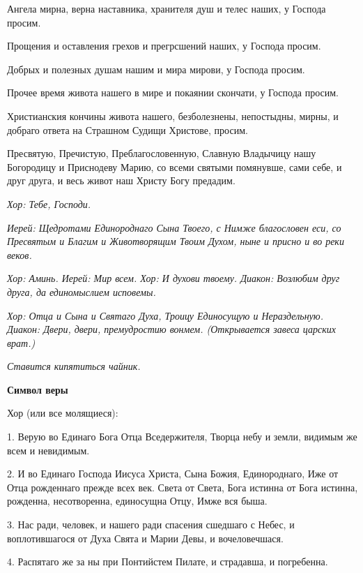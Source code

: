   Ангела мирна, верна наставника, хранителя душ и телес наших, у Господа просим. 


  Прощения и оставления грехов и прегрсшений наших, у Господа просим. 


  Добрых и полезных душам нашим и мира мирови, у Господа просим. 


  Прочее время живота нашего в мире и покаянии скончати, у Господа просим. 


  Христианския кончины живота нашего, безболезнены, непостыдны, мирны, и добраго ответа на Страшном Судищи Христове, просим. 


  Пресвятую, Пречистую, Преблагословенную, Славную Владычицу нашу Богородицу и Приснодеву Марию, со всеми святыми помянувше, сами себе, и друг друга, и весь живот наш Христу Богу предадим.


\itshape Хор:\normalfont{} Тебе, Господи.


\itshape Иерей:\normalfont{} Щедротами Единороднаго Сына Твоего, с Нимже благословен еси, со Пресвятым и Благим и Животворящим Твоим Духом, ныне и присно и во реки веков.


\itshape Хор:\normalfont{} Аминь. \itshape  Иерей:\normalfont{} Мир всем. \itshape  Хор:\normalfont{} И духови твоему. \itshape  Диакон:\normalfont{} Возлюбим друг друга, да единомыслием исповемы.


\itshape Хор:\normalfont{} Отца и Сына и Святаго Духа, Троицу Единосущую и Нераздельную. \itshape  Диакон:\normalfont{} Двери, двери, премудростию вонмем. \itshape  (Открывается завеса царских врат\normalfont{}.)

 


\itshape  Ставится кипятиться чайник\normalfont{}. 


\medskip


 \bfseries  Символ веры \normalfont{}


  Хор (или все молящиеся):


  1. Верую во Единаго Бога Отца Вседержителя, Творца небу и земли, видимым же всем и невидимым. 


  2. И во Единаго Господа Иисуса Христа, Сына Божия, Единороднаго, Иже от Отца рожденнаго прежде всех век. Света от Света, Бога истинна от Бога истинна, рожденна, несотворенна, единосущна Отцу, Имже вся быша.


  3. Нас ради, человек, и нашего ради спасения сшедшаго с Небес, и воплотившагося от Духа Свята и Марии Девы, и вочеловечшася.


  4. Распятаго же за ны при Понтийстем Пилате, и страдавша, и погребенна.


